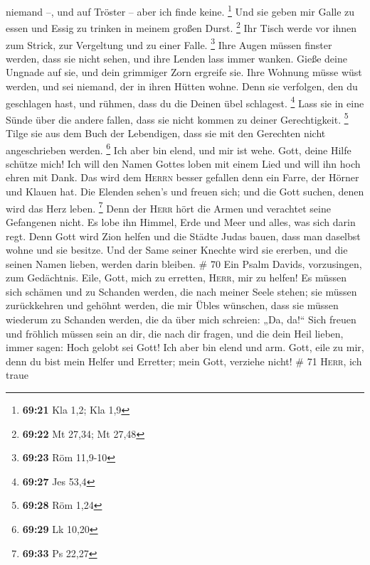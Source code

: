 niemand --, und auf Tröster -- aber ich finde keine. \footnote{\textbf{69:21}
  Kla 1,2; Kla 1,9}  Und sie geben mir Galle zu essen und
Essig zu trinken in meinem großen Durst. \footnote{\textbf{69:22} Mt
  27,34; Mt 27,48}  Ihr Tisch werde vor ihnen zum Strick,
zur Vergeltung und zu einer Falle. \footnote{\textbf{69:23} Röm 11,9-10}
 Ihre Augen müssen finster werden, dass sie nicht sehen,
und ihre Lenden lass immer wanken.  Gieße deine Ungnade
auf sie, und dein grimmiger Zorn ergreife sie.  Ihre
Wohnung müsse wüst werden, und sei niemand, der in ihren Hütten wohne.
 Denn sie verfolgen, den du geschlagen hast, und rühmen,
dass du die Deinen übel schlagest. \footnote{\textbf{69:27} Jes 53,4}
 Lass sie in eine Sünde über die andere fallen, dass sie
nicht kommen zu deiner Gerechtigkeit. \footnote{\textbf{69:28} Röm 1,24}
 Tilge sie aus dem Buch der Lebendigen, dass sie mit den
Gerechten nicht angeschrieben werden. \footnote{\textbf{69:29} Lk 10,20}
 Ich aber bin elend, und mir ist wehe. Gott, deine Hilfe
schütze mich!  Ich will den Namen Gottes loben mit einem
Lied und will ihn hoch ehren mit Dank.  Das wird dem
\textsc{Herrn} besser gefallen denn ein Farre, der Hörner und Klauen
hat.  Die Elenden sehen's und freuen sich; und die Gott
suchen, denen wird das Herz leben. \footnote{\textbf{69:33} Ps 22,27}
 Denn der \textsc{Herr} hört die Armen und verachtet
seine Gefangenen nicht.  Es lobe ihn Himmel, Erde und
Meer und alles, was sich darin regt.  Denn Gott wird Zion
helfen und die Städte Judas bauen, dass man daselbst wohne und sie
besitze.  Und der Same seiner Knechte wird sie ererben,
und die seinen Namen lieben, werden darin bleiben. \# 70 
Ein Psalm Davids, vorzusingen, zum Gedächtnis.  Eile,
Gott, mich zu erretten, \textsc{Herr}, mir zu helfen!  Es
müssen sich schämen und zu Schanden werden, die nach meiner Seele
stehen; sie müssen zurückkehren und gehöhnt werden, die mir Übles
wünschen,  dass sie müssen wiederum zu Schanden werden,
die da über mich schreien: „Da, da!{}``  Sich freuen und
fröhlich müssen sein an dir, die nach dir fragen, und die dein Heil
lieben, immer sagen: Hoch gelobt sei Gott!  Ich aber bin
elend und arm. Gott, eile zu mir, denn du bist mein Helfer und Erretter;
mein Gott, verziehe nicht! \# 71  \textsc{Herr}, ich traue
